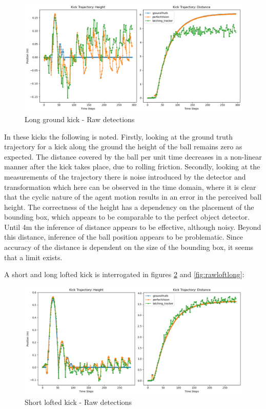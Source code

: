 \documentclass[a4paper,twoside,12pt]{report}
\begin{document}
\begin{figure}[h!]
\begin{center}
\includegraphics[width=14cm]{images/raw_ground_long.png}
\caption{Long ground kick - Raw detections}
\label{fig:rawgroundlong}
\end{center}
\end{figure}

In these kicks the following is noted. Firstly, looking at the ground truth trajectory for a kick along the ground the height of the ball remains zero as expected. The distance covered by the ball per unit time decreases in a non-linear manner after the kick takes place, due to rolling friction. Secondly, looking at the measurements of the trajectory there is noise introduced by the detector and transformation which here can be observed in the time domain, where it is clear that the cyclic nature of the agent motion results in an error in the perceived ball height. The correctness of the height has a dependency on the placement of the bounding box, which appears to be comparable to the perfect object detector. Until 4m the inference of distance appears to be effective, although noisy. Beyond this distance, inference of the ball position appears to be problematic. Since accuracy of the distance is dependent on the size of the bounding box, it seems that a limit exists.

A short and long lofted kick is interrogated in figures \ref{fig:rawloftshort} and \ref{fig:rawloftlong}:

\begin{figure}[h!]
\begin{center}
\includegraphics[width=14cm]{images/raw_loft_short.png}
\caption{Short lofted kick - Raw detections}
\label{fig:rawloftshort}
\end{center}
\end{figure}
\end{document}
